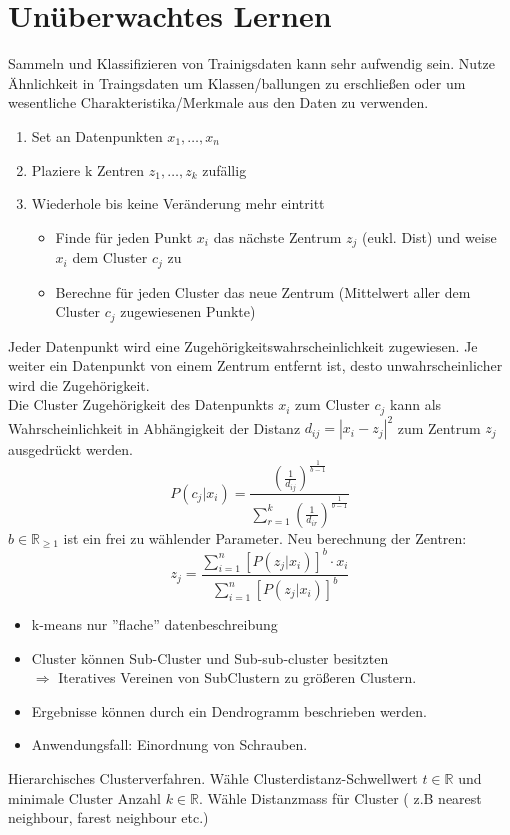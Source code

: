 \chapter{Unüberwachtes Lernen}
Sammeln und Klassifizieren von Trainigsdaten kann sehr aufwendig sein.
Nutze Ähnlichkeit in Traingsdaten um Klassen/ballungen zu erschließen oder
um wesentliche Charakteristika/Merkmale aus den Daten zu verwenden.

\begin{enumerate}
    \item Set an Datenpunkten $x_1,\dots,x_n$
    \item Plaziere k Zentren $z_1,\dots,z_k$ zufällig
    \item Wiederhole bis keine Veränderung mehr eintritt
    \begin{itemize}
        \item Finde für jeden Punkt $x_i$ das nächste Zentrum $z_j$ (eukl. Dist)
        und weise $x_i$ dem Cluster $c_j$ zu
        \item Berechne für jeden Cluster das neue Zentrum (Mittelwert aller
        dem Cluster $c_j$ zugewiesenen Punkte)
    \end{itemize}
\end{enumerate}

Jeder Datenpunkt wird eine Zugehörigkeitswahrscheinlichkeit zugewiesen.
Je weiter ein Datenpunkt von einem Zentrum entfernt ist, desto unwahrscheinlicher
wird die Zugehörigkeit. \\Die Cluster Zugehörigkeit des Datenpunkts $x_i$ zum Cluster
$c_j$ kann als Wahrscheinlichkeit in Abhängigkeit der Distanz $d_{ij} = |x_i - z_j|^2$
 zum Zentrum $z_j$ ausgedrückt werden.
\begin{equation}
    P(c_j | x_i) = \frac{(\frac{1}{d_{ij}})^{\frac{1}{b-1}}}{\sum_{r=1}^k (\frac{1}{d_{ir}})^{\frac{1}{b-1}}}
\end{equation}
$b \in \mathbb{R}_{\geq1}$ ist ein frei zu wählender Parameter. Neu berechnung
der Zentren:
\begin{equation}
    z_j = \frac{\sum_{i=1}^n [P(z_j|x_i)]^b \cdot x_i}{\sum_{i=1}^n [P(z_j | x_i)]^b}
\end{equation}
\begin{itemize}
    \item k-means nur ''flache'' datenbeschreibung
    \item Cluster können Sub-Cluster und Sub-sub-cluster besitzten\\
    $\Rightarrow$ Iteratives Vereinen von SubClustern zu größeren Clustern.
    \item Ergebnisse können durch ein Dendrogramm beschrieben werden.
    \item Anwendungsfall: Einordnung von Schrauben.
\end{itemize}
Hierarchisches Clusterverfahren. Wähle Clusterdistanz-Schwellwert $t \in \mathbb{R}$
und minimale Cluster Anzahl $k \in \mathbb{R}$. Wähle Distanzmass für Cluster (
z.B nearest neighbour, farest neighbour etc.)

